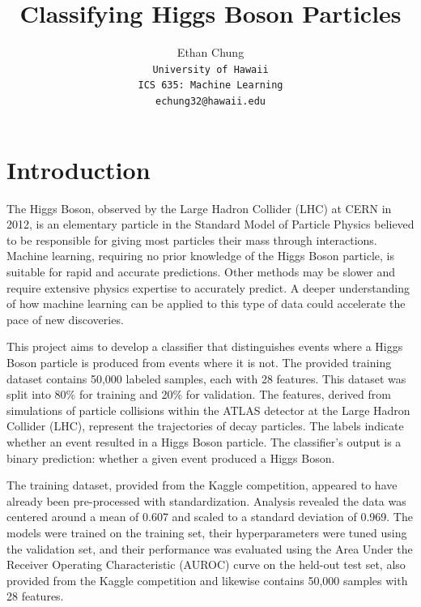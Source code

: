 \documentclass[letterpaper]{article}
\begin{document}
	\title{Classifying Higgs Boson Particles}
	
	\author{Ethan Chung\\
		{\tt\small University of Hawaii}\\
		{\tt\small ICS 635: Machine Learning}\\
		{\tt\small echung32@hawaii.edu}}
	
	\maketitle
	
	\section{Introduction}
	
	The Higgs Boson, observed by the Large Hadron Collider (LHC) at CERN in 2012, is an elementary particle in the Standard Model of Particle Physics believed to be responsible for giving most particles their mass through interactions. Machine learning, requiring no prior knowledge of the Higgs Boson particle, is suitable for rapid and accurate predictions. Other methods may be slower and require extensive physics expertise to accurately predict. A deeper understanding of how machine learning can be applied to this type of data could accelerate the pace of new discoveries.
	
	This project aims to develop a classifier that distinguishes events where a Higgs Boson particle is produced from events where it is not. The provided training dataset contains 50,000 labeled samples, each with 28 features. This dataset was split into 80\% for training and 20\% for validation. The features, derived from simulations of particle collisions within the ATLAS detector at the Large Hadron Collider (LHC), represent the trajectories of decay particles. The labels indicate whether an event resulted in a Higgs Boson particle. The classifier's output is a binary prediction: whether a given event produced a Higgs Boson.
	
	The training dataset, provided from the Kaggle competition, appeared to have already been pre-processed with standardization. Analysis revealed the data was centered around a mean of 0.607 and scaled to a standard deviation of 0.969. The models were trained on the training set, their hyperparameters were tuned using the validation set, and their performance was evaluated using the Area Under the Receiver Operating Characteristic (AUROC) curve on the held-out test set, also provided from the Kaggle competition and likewise contains 50,000 samples with 28 features.
	
\end{document}

